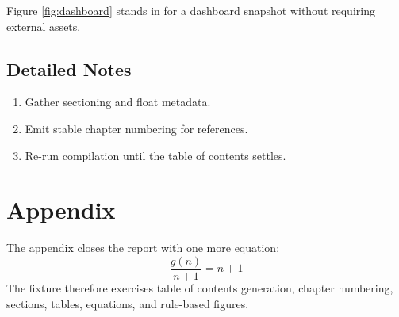 \documentclass{report}
\begin{document}
Figure \ref{fig:dashboard} stands in for a dashboard snapshot without requiring external assets.

\section{Detailed Notes}
\begin{enumerate}
\item Gather sectioning and float metadata.
\item Emit stable chapter numbering for references.
\item Re-run compilation until the table of contents settles.
\end{enumerate}

\chapter{Appendix}
The appendix closes the report with one more equation:
\[
\frac{g(n)}{n + 1} = n + 1
\]
The fixture therefore exercises table of contents generation, chapter numbering, sections, tables, equations, and rule-based figures.
\end{document}
